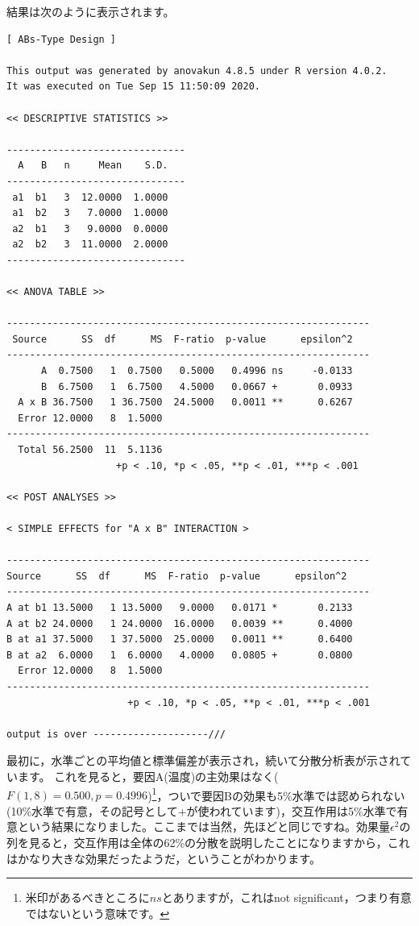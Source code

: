 \documentclass{ltjsarticle}
\begin{document}
結果は次のように表示されます。
\begin{tcolorbox}
\begin{verbatim}
[ ABs-Type Design ]

This output was generated by anovakun 4.8.5 under R version 4.0.2.
It was executed on Tue Sep 15 11:50:09 2020.

<< DESCRIPTIVE STATISTICS >>

-------------------------------
  A   B   n     Mean    S.D. 
-------------------------------
 a1  b1   3  12.0000  1.0000 
 a1  b2   3   7.0000  1.0000 
 a2  b1   3   9.0000  0.0000 
 a2  b2   3  11.0000  2.0000 
-------------------------------

<< ANOVA TABLE >>

---------------------------------------------------------------
 Source      SS  df      MS  F-ratio  p-value      epsilon^2 
---------------------------------------------------------------
      A  0.7500   1  0.7500   0.5000   0.4996 ns     -0.0133 
      B  6.7500   1  6.7500   4.5000   0.0667 +       0.0933 
  A x B 36.7500   1 36.7500  24.5000   0.0011 **      0.6267 
  Error 12.0000   8  1.5000                                  
---------------------------------------------------------------
  Total 56.2500  11  5.1136                                  
                   +p < .10, *p < .05, **p < .01, ***p < .001

<< POST ANALYSES >>

< SIMPLE EFFECTS for "A x B" INTERACTION >

---------------------------------------------------------------
Source      SS  df      MS  F-ratio  p-value      epsilon^2 
---------------------------------------------------------------
A at b1 13.5000   1 13.5000   9.0000   0.0171 *       0.2133 
A at b2 24.0000   1 24.0000  16.0000   0.0039 **      0.4000 
B at a1 37.5000   1 37.5000  25.0000   0.0011 **      0.6400 
B at a2  6.0000   1  6.0000   4.0000   0.0805 +       0.0800 
  Error 12.0000   8  1.5000                                  
---------------------------------------------------------------
                     +p < .10, *p < .05, **p < .01, ***p < .001

output is over --------------------///
\end{verbatim}
\end{tcolorbox}

最初に，水準ごとの平均値と標準偏差が表示され，続いて分散分析表が示されています。
これを見ると，要因A(温度)の主効果はなく($F(1,8)=0.500,p=0.4996$)\footnote{米印があるべきところに$ns$とありますが，これはnot significant，つまり有意ではないという意味です。}，ついで要因Bの効果も5\%水準では認められない(10\%水準で有意，その記号として$+$が使われています)，交互作用は5\%水準で有意という結果になりました。ここまでは当然，先ほどと同じですね。効果量$\epsilon^2$の列を見ると，交互作用は全体の62\%の分散を説明したことになりますから，これはかなり大きな効果だったようだ，ということがわかります。
\end{document}
